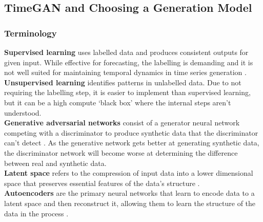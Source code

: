 \documentclass[10pt,twocolumn]{article}
\begin{document}
\subsection{TimeGAN and Choosing a Generation Model}

\subsubsection{Terminology}
\textbf{Supervised learning} uses labelled data and produces consistent outputs for given input. While effective for forecasting, the labelling is demanding and it is not well suited for maintaining temporal dynamics in time series generation \cite{yoon2019timeseriesgenerative}. \\
\textbf{Unsupervised learning} identifies patterns in unlabelled data. Due to not requiring the labelling step, it is easier to implement than supervised learning, but it can be a high compute ‘black box’ where the internal steps aren’t understood.\\
\textbf{Generative adversarial networks} consist of a generator neural network competing with a discriminator to produce synthetic data that the discriminator can’t detect \cite{awsGAN}. As the generative network gets better at generating synthetic data, the discriminator network will become worse at determining the difference between real and synthetic data.\\
\textbf{Latent space} refers to the compression of input data into a lower dimensional space that preserves essential features of the data’s structure \cite{ibmLatentSpace}. \\
\textbf{Autoencoders} are the primary neural networks that learn to encode data to a latent space and then reconstruct it, allowing them to learn the structure of the data in the process \cite{ibmLatentSpace}.
\end{document}
